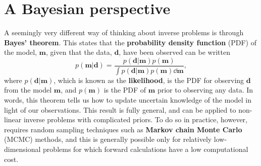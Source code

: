 \section*{A Bayesian perspective}
A seemingly very different way of thinking about inverse problems is through \textbf{Bayes' theorem}. This states that 
 the \textbf{probability density function} (PDF) of the model, $\mathbf{m}$, given that
the data, $\mathbf{d}$, have been observed can be written
\begin{equation}
    p(\mathbf{m}|\mathbf{d}) = \frac{ p(\mathbf{d}|\mathbf{m}) p(\mathbf{m})}{\int p(\mathbf{d}|\mathbf{m}) p(\mathbf{m}) \dd \mathbf{m}}, 
    \label{eq:37}
\end{equation}
where $p(\mathbf{d}|\mathbf{m})$, which is known as the \textbf{likelihood}, is the PDF for observing $\mathbf{d}$ from the model $\mathbf{m}$, 
and $p(\mathbf{m})$ is the PDF of $\mathbf{m}$ prior to observing any data. In words, this theorem tells us how to update uncertain 
knowledge of the model in light of our observations. This result is fully general, and can be applied to non-linear inverse problems 
with complicated priors. To do so in practice, however, requires random sampling techniques such as \textbf{Markov chain Monte Carlo} (MCMC) 
methods, and this is generally possible only for relatively low-dimensional problems for which forward calculations have a 
low computational cost.

